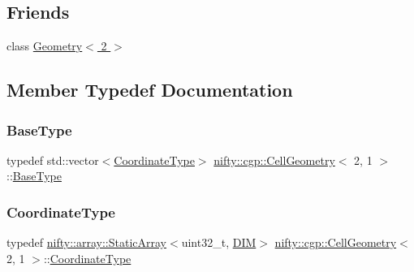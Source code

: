 \subsection*{Friends}
\begin{DoxyCompactItemize}
\item 
class \hyperlink{classnifty_1_1cgp_1_1CellGeometry_3_012_00_011_01_4_adfd68abfc6c19d6cc9ac2eb46fcfa819}{Geometry$<$ 2 $>$}
\end{DoxyCompactItemize}


\subsection{Member Typedef Documentation}
\mbox{\label{classnifty_1_1cgp_1_1CellGeometry_3_012_00_011_01_4_a10f7d7a27ef9080c3a94fc69a258c55e}} 
\subsubsection{\texorpdfstring{Base\+Type}{BaseType}}
{\footnotesize\ttfamily typedef std\+::vector$<$\hyperlink{classnifty_1_1cgp_1_1CellGeometry_3_012_00_011_01_4_a61e8ffb089e3ca4bf7998e77dfc278bc}{Coordinate\+Type}$>$ \hyperlink{classnifty_1_1cgp_1_1CellGeometry}{nifty\+::cgp\+::\+Cell\+Geometry}$<$ 2, 1 $>$\+::\hyperlink{classnifty_1_1cgp_1_1CellGeometry_3_012_00_011_01_4_a10f7d7a27ef9080c3a94fc69a258c55e}{Base\+Type}}

\mbox{\label{classnifty_1_1cgp_1_1CellGeometry_3_012_00_011_01_4_a61e8ffb089e3ca4bf7998e77dfc278bc}} 
\subsubsection{\texorpdfstring{Coordinate\+Type}{CoordinateType}}
{\footnotesize\ttfamily typedef \hyperlink{namespacenifty_1_1array_a683f151f19c851754e0c6d55ed16a0c2}{nifty\+::array\+::\+Static\+Array}$<$uint32\+\_\+t, \hyperlink{classnifty_1_1cgp_1_1CellGeometry_3_012_00_011_01_4_a42d125e23384bc4a770893276750d9d1}{D\+IM}$>$ \hyperlink{classnifty_1_1cgp_1_1CellGeometry}{nifty\+::cgp\+::\+Cell\+Geometry}$<$ 2, 1 $>$\+::\hyperlink{classnifty_1_1cgp_1_1CellGeometry_3_012_00_011_01_4_a61e8ffb089e3ca4bf7998e77dfc278bc}{Coordinate\+Type}}

